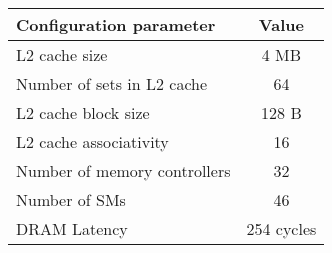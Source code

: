 \begin{tabular}{|l|c|}
    \hline
    \textbf{Configuration parameter} & \textbf{Value} \\
    \hline
    \hline
    L2 cache size & 4 MB \\
    Number of sets in L2 cache & 64 \\
    L2 cache block size & 128 B \\
    L2 cache associativity & 16 \\
    Number of memory controllers & 32 \\
    Number of SMs & 46 \\
    DRAM Latency & 254 cycles \\
    \hline
\end{tabular}